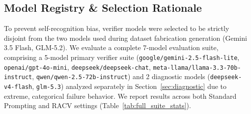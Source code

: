 \documentclass[conference]{IEEEtran}
\begin{document}
\subsection{Model Registry \& Selection Rationale}
To prevent self-recognition bias, verifier models were selected to be strictly disjoint from the two models used during dataset fabrication generation (Gemini 3.5 Flash, GLM-5.2). We evaluate a complete 7-model evaluation suite, comprising a 5-model primary verifier suite (\texttt{google/gemini-2.5-flash-lite}, \texttt{openai/gpt-4o-mini}, \texttt{deepseek/deepseek-chat}, \texttt{meta-llama/llama-3.3-70b-instruct}, \texttt{qwen/qwen-2.5-72b-instruct}) and 2 diagnostic models (\texttt{deepseek-v4-flash}, \texttt{glm-5.3}) analyzed separately in Section~\ref{sec:diagnostic} due to extreme, categorical failure behavior. We report results across both Standard Prompting and RACV settings (Table~\ref{tab:full_suite_stats}).
\end{document}
